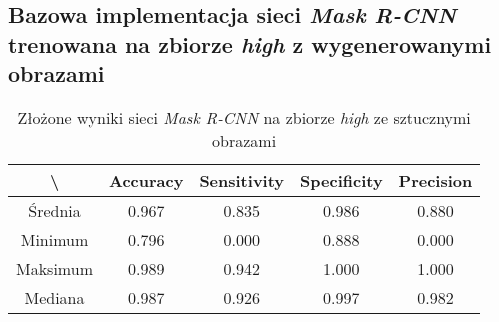 \subsection{Bazowa implementacja sieci \textit{Mask R-CNN} trenowana na zbiorze \textit{high} z wygenerowanymi obrazami}

\begin{table}[H]
	\centering
	\caption{Złożone wyniki sieci \textit{Mask R-CNN} na zbiorze \textit{high} ze sztucznymi obrazami}
	\vspace{6pt}
	{\footnotesize
		\begin{tabular}{|c|c|c|c|c|}
      \hline \textbackslash & Accuracy & Sensitivity & Specificity & Precision \\
      \hline Średnia & 0.967 & 0.835 & 0.986 & 0.880 \\
      \hline Minimum & 0.796 & 0.000 & 0.888 & 0.000 \\
      \hline Maksimum & 0.989 & 0.942 & 1.000 & 1.000 \\
      \hline Mediana & 0.987 & 0.926 & 0.997 & 0.982 \\
      \hline
		\end{tabular}
	}
  \vspace{0pt}
  \label{Tab:high_original_generated_calculated}
\end{table}

